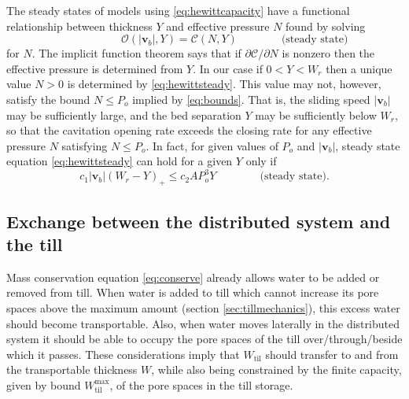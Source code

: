 \documentclass[11pt,final]{amsart}
\newcommand\bv{\mathbf{v}}
\newcommand{\Wtil}{W_{\text{til}}}
\newcommand{\Wtilmax}{W_{\text{til}}^{\text{max}}}
\begin{document}
The steady states of models using \eqref{eq:hewittcapacity} have a functional relationship between thickness $Y$ and effective pressure $N$ found by solving
\begin{equation}
\phantom{foo} \qquad \qquad \mathcal{O}(|\bv_b|,Y) = \mathcal{C}(N,Y) \qquad \qquad \text{(steady state)} \label{eq:hewittsteady}
\end{equation}
for $N$.  The implicit function theorem says that if $\partial\mathcal{C}/\partial N$ is nonzero then the effective pressure is determined from $Y$.  In our case if $0<Y<W_r$ then a unique value $N>0$ is determined by \eqref{eq:hewittsteady}.  This value may not, however, satisfy the bound $N \le P_o$ implied by \eqref{eq:bounds}.  That is, the sliding speed $|\bv_b|$ may be sufficiently large, and the bed separation $Y$ may be sufficiently below $W_r$, so that the cavitation opening rate exceeds the closing rate for any effective pressure $N$ satisfying $N\le P_o$.  In fact, for given values of $P_o$ and $|\bv_b|$, steady state equation \eqref{eq:hewittsteady} can hold for a given $Y$ only if
\begin{equation}
c_1 |\bv_b| (W_r - Y)_+ \le c_2 A P_o^3 Y \qquad \qquad \text{(steady state)}. \label{eq:steadyOCbound}
\end{equation}


\subsection*{Exchange between the distributed system and the till}  Mass conservation equation \eqref{eq:conserve} already allows water to be added or removed from till.  When water is added to till which cannot increase its pore spaces above the maximum amount (section \ref{sec:tillmechanics}), this excess water should become transportable.  Also, when water moves laterally in the distributed system it should be able to occupy the pore spaces of the till over/through/beside which it passes.  These considerations imply that $\Wtil$ should transfer to and from the transportable thickness $W$, while also being constrained by the finite capacity, given by bound $\Wtilmax$, of the pore spaces in the till storage.
\end{document}
